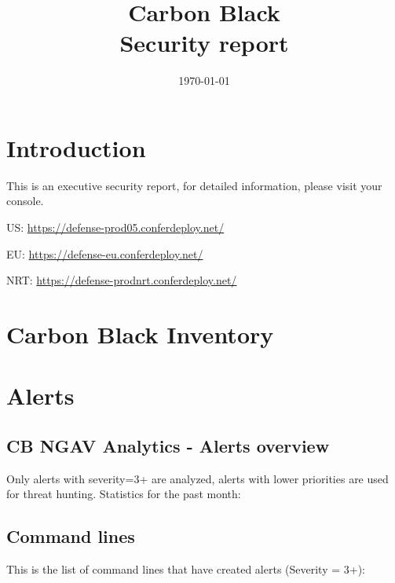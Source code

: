\documentclass[12pt,letterpaper]{report}
\begin{document}

\thispagestyle{empty}
\bannercbcontainer
\title{Carbon Black\\Security report}

\date{\today}
\logocbcontainer

\newpage

\tableofcontents
\listoftables
\listoffigures

\chapter{Introduction}

This is an executive security report, for detailed information, please visit your console.
\vspace{1cm}

US: \href{https://defense-prod05.conferdeploy.net/}{https://defense-prod05.conferdeploy.net/}

EU: \href{https://defense-eu.conferdeploy.net/}{https://defense-eu.conferdeploy.net/}

NRT: \href{https://defense-prodnrt.conferdeploy.net/}{https://defense-prodnrt.conferdeploy.net/}


\chapter{Carbon Black Inventory}


\chapter{Alerts}
\section{CB NGAV Analytics - Alerts overview}
Only alerts with severity=3+ are analyzed, alerts with lower priorities are used for threat hunting.
\vskip10pt
Statistics for the past month:\\



\section{Command lines}
This is the list of command lines that have created alerts (Severity = 3+):\\
\\
\end{document}
